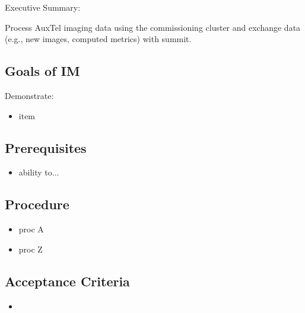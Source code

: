 
Executive Summary:

Process AuxTel imaging data using the commissioning cluster and exchange data (e.g., new images, computed metrics) with summit.

\subsection{Goals of IM}
Demonstrate:
\begin{itemize}
\item item
\end{itemize}

\subsection{Prerequisites}
\begin{itemize}
\item ability to...
\end{itemize}

\subsection{Procedure}
\begin{itemize}
\item proc A
\item proc Z
\end{itemize}

\subsection{Acceptance Criteria}
\begin{itemize}
\item
\end{itemize}
